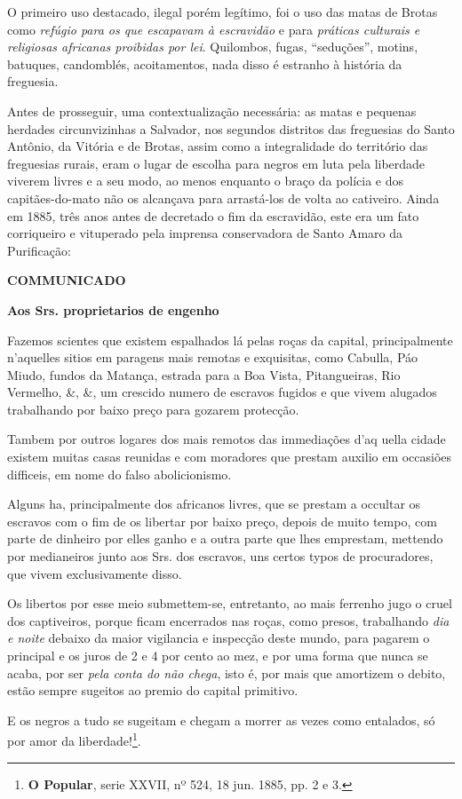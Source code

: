 O primeiro uso destacado, ilegal porém legítimo, foi o uso das matas de Brotas como \textit{refúgio para os que escapavam à escravidão} e para \textit{práticas culturais e religiosas africanas proibidas por lei}. Quilombos, fugas, ``seduções'', motins, batuques, candomblés, acoitamentos, nada disso é estranho à história da freguesia.

Antes de prosseguir, uma contextualização necessária: as matas e pequenas herdades circunvizinhas a Salvador, nos segundos distritos das freguesias do Santo Antônio, da Vitória e de Brotas, assim como a integralidade do território das freguesias rurais, eram o lugar de escolha para negros em luta pela liberdade viverem livres e a seu modo, ao menos enquanto o braço da polícia e dos capitães-do-mato não os alcançava para arrastá-los de volta ao cativeiro. Ainda em 1885, três anos antes de decretado o fim da escravidão, este era um fato corriqueiro e vituperado pela imprensa conservadora de Santo Amaro da Purificação:

\begin{citacao}
\textbf{COMMUNICADO}

\textbf{Aos Srs. proprietarios de engenho}

Fazemos scientes que existem espalhados lá pelas roças da capital, principalmente n'aquelles sitios em paragens mais remotas e exquisitas, como Cabulla, Páo Miudo, fundos da Matança, estrada para a Boa Vista, Pitangueiras, Rio Vermelho, \&, \&, um crescido numero de escravos fugidos e que vivem alugados trabalhando por baixo preço para gozarem protecção.

Tambem por outros logares dos mais remotos das immediações d'aq	uella cidade existem muitas casas reunidas e com moradores que prestam auxilio em occasiões difficeis, em nome do falso abolicionismo.

Alguns ha, principalmente dos africanos livres, que se prestam a occultar os escravos com o fim de os libertar por baixo preço, depois de muito tempo, com parte de dinheiro por elles ganho e a outra parte que lhes emprestam, mettendo por medianeiros junto aos Srs. dos escravos, uns certos typos de procuradores, que vivem exclusivamente disso.

Os libertos por esse meio submettem-se, entretanto, ao mais ferrenho jugo o cruel dos captiveiros, porque ficam encerrados nas roças, como presos, trabalhando \textit{dia e noite} debaixo da maior vigilancia e inspecção deste mundo, para pagarem o principal e os juros de 2 e 4 por cento ao mez, e por uma forma que nunca se acaba, por ser \textit{pela conta do não chega}, isto é, por mais que amortizem o debito, estão sempre sugeitos ao premio do capital primitivo.

E os negros a tudo se sugeitam e chegam a morrer as vezes como entalados, só por amor da liberdade!\footnote{\textbf{O Popular}, serie XXVII, nº 524, 18 jun. 1885, pp. 2 e 3.}.
\end{citacao}

